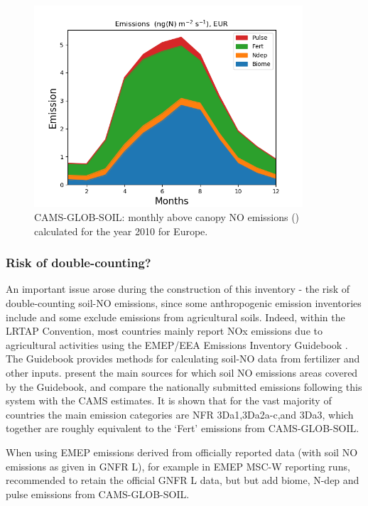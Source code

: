 \begin{figure}
  \centering
   \includegraphics*[width=10cm]{FIGS_UPDATES/PlotRegionalTimeSeriesMonthly_EUR_YLnSMI_Mar2021.png}
  \parbox{10cm}{
  \caption{CAMS-GLOB-SOIL: monthly above canopy NO emissions (\ngN)  calculated for the year 2010
     for Europe.
    \label{fig:SIemis}}
  }
\end{figure}



\subsubsection{Risk of double-counting?}

An important issue arose during the construction  of this inventory - the risk of double-counting
soil-NO emissions, since some anthropogenic  emission inventories include and 
some exclude emissions from agricultural soils.
Indeed, within the LRTAP Convention,
most countries mainly report NOx emissions due to agricultural activities
using the EMEP/EEA Emissions Inventory Guidebook
\citep{Guidebook2019:3D}. The Guidebook provides methods for calculating
soil-NO data from fertilizer and other inputs.
\citet{SimpsonDarras:2021} present the main sources for which
 soil NO emissions areas covered by the Guidebook, and
compare the nationally
submitted emissions following this system with the CAMS estimates.
It is shown that for the vast majority of countries
the main emission categories are NFR  3Da1,3Da2a-c,and
3Da3, which together are roughly equivalent to
the `Fert' emissions from CAMS-GLOB-SOIL.

When using EMEP emissions derived from
officially reported data (with soil NO emissions as given in GNFR L),
for example in EMEP MSC-W reporting runs,
\citet{SimpsonDarras:2021} recommended to retain the
official GNFR L data, but but add biome, N-dep and pulse emissions from CAMS-GLOB-SOIL.

